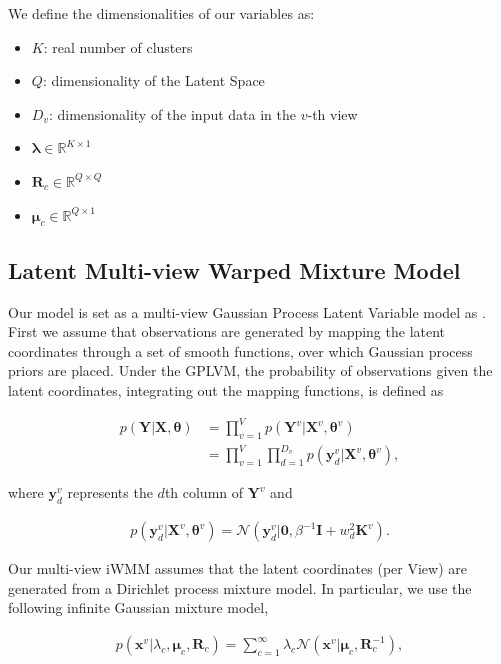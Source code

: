 \documentclass[]{article}
\newcommand{\gD}[2]{\mathcal{N}\left(#1,#2\right)}
\newcommand{\eye}{\mathbf{I}}
\newcommand{\setYv}{\mathbf{Y}^{v}}
\newcommand{\setY}{\mathbf{Y}}
\newcommand{\setXv}{\mathbf{X}^{v}}
\newcommand{\setKv}{\mathbf{K}^{v}}
\newcommand{\setX}{\mathbf{X}}
\newcommand{\hParams}{\boldsymbol{\theta}}
\newcommand{\hParamsv}{\boldsymbol{\theta}^{v}}
\newcommand{\lambdac}{\lambda_c}
\newcommand{\muC}{\boldsymbol{\mu}_c}
\newcommand{\RC}{\mathbf{R}_c}
\begin{document}
We define the dimensionalities of our variables as:

\begin{itemize}
	\item 	$K$: real number of clusters
	\item $Q$:  dimensionality of the Latent Space
	\item $D_v$: dimensionality of the input data in the $v$-th view 
	\item $\boldsymbol{\lambda} \in \mathbb{R}^{K\times 1}$ 
	\item $\mathbf{R}_c \in \mathbb{R}^{Q\times Q}$
	\item $\boldsymbol{\mu}_c \in \mathbb{R}^{Q\times 1}$
\end{itemize}



\subsection{Latent Multi-view Warped Mixture Model}

Our model is set as a multi-view Gaussian Process Latent Variable model as \cite{Lawrence03}. First we assume 
that observations are generated by mapping the latent coordinates through a set of smooth functions, over
which Gaussian process priors are placed. Under the GPLVM, the probability of observations given the latent
coordinates, integrating out the mapping functions, is defined as

\begin{align}
p\left(\setY|\setX,\hParams\right) &= \prod_{v=1}^{V}p\left(\setYv|\setXv,\hParamsv\right) \\
   &= \prod_{v=1}^{V}\prod_{d=1}^{D_v}p\left(\mathbf{y}_d^v|\setXv,\hParamsv\right),
\end{align}


where $\mathbf{y}_d^v$ represents the $d$th column of $\setYv$ and

\begin{align}
p\left(\mathbf{y}_d^v|\setXv,\hParamsv\right) = \gD{\mathbf{y}_d^v|\mathbf{0}}{\beta^{-1}\eye + w_d^2\setKv}.
\end{align}

Our multi-view iWMM assumes that the latent coordinates (per View) are generated from a Dirichlet process mixture model. In particular, we use the following infinite Gaussian mixture model,

\begin{align}
p(\mathbf{x}^{v}|\lambdac,\muC,\RC) = \sum_{c=1}^{\infty}\lambdac \gD{\mathbf{x}^{v}|\muC}{\RC^{-1}},
\end{align}
\end{document}
